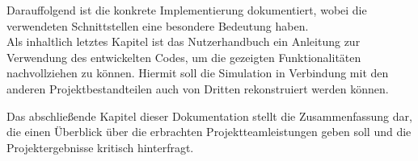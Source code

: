 	Darauffolgend ist die konkrete Implementierung dokumentiert, wobei die verwendeten Schnittstellen eine besondere Bedeutung haben.\\
	Als inhaltlich letztes Kapitel ist das Nutzerhandbuch ein Anleitung zur Verwendung des entwickelten Codes, um die gezeigten Funktionalitäten nachvollziehen zu können. Hiermit soll die Simulation in Verbindung mit den anderen Projektbestandteilen auch von Dritten rekonstruiert werden können.
	
	Das abschließende Kapitel dieser Dokumentation stellt die Zusammenfassung dar, die einen Überblick über die erbrachten Projektteamleistungen geben  soll und die Projektergebnisse kritisch hinterfragt.
	